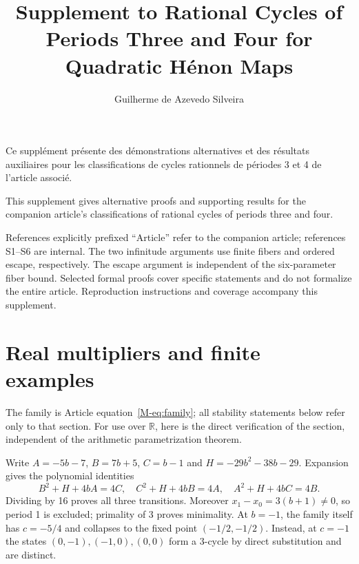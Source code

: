 \documentclass{jT}
\newcommand{\R}{\mathbb R}
\begin{document}
\title[Rational cycles for quadratic H\'enon maps]{Supplement to Rational Cycles of Periods Three and Four for Quadratic H\'enon Maps}
\author{Guilherme de Azevedo Silveira}
\address{Alura\newline Rua Vergueiro, 3185, 8th floor\newline S\~ao Paulo, SP 04101-300, Brazil}
\maketitle
\begin{resume}
Ce supplément présente des démonstrations alternatives et des résultats auxiliaires pour les classifications de cycles rationnels de périodes 3 et 4 de l'article associé.
\end{resume}
\begin{abstr}
This supplement gives alternative proofs and supporting results for the companion article's classifications of rational cycles of periods three and four.
\end{abstr}
\bigskip
References explicitly prefixed ``Article'' refer to the companion article; references S1--S6 are internal. The two infinitude arguments use finite fibers and ordered escape, respectively. The escape argument is independent of the six-parameter fiber bound. Selected formal proofs cover specific statements and do not formalize the entire article. Reproduction instructions and coverage accompany this supplement.

\section{Real multipliers and finite examples}\label{sup:examples}
The family is Article equation~\eqref{M-eq:family}; all stability statements below refer only to that section.
For use over $\R$, here is the direct verification of the section, independent of the arithmetic parametrization theorem.

Write $A=-5b-7$, $B=7b+5$, $C=b-1$ and $H=-29b^2-38b-29$. Expansion gives the polynomial identities
\[
B^2+H+4bA=4C,\quad C^2+H+4bB=4A,\quad A^2+H+4bC=4B.
\]
Dividing by 16 proves all three transitions. Moreover $x_1-x_0=3(b+1)\ne0$, so period 1 is excluded; primality of 3 proves minimality. At $b=-1$, the family itself has $c=-5/4$ and collapses to the fixed point $(-1/2,-1/2)$. Instead, at $c=-1$ the states $(0,-1),(-1,0),(0,0)$ form a 3-cycle by direct substitution and are distinct.
\end{document}
